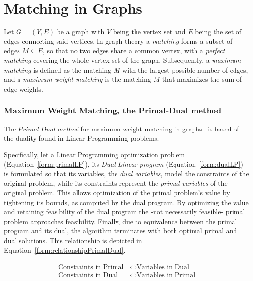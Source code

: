 \section{Matching in Graphs} \label{sec:theorBack-MWMGraphs}

Let $G=(V,E)$ be a graph with $V$ being the vertex set and $E$ being the set of edges connecting said vertices. In graph theory a \emph{matching} forms a subset of edges $M\subseteq E$, so that no two edges share a common vertex, with a \emph{perfect matching} covering the whole vertex set of the graph. Subsequently, a \emph{maximum matching} is defined as the matching $M$ with the largest possible number of edges, and a \emph{maximum weight matching} is the matching $M$ that maximizes the sum of edge weights. 



\subsubsection{Maximum Weight Matching, the Primal-Dual method}

The \emph{Primal-Dual method} for maximum weight matching in graphs~\cite{EdmondsMatching} is based of the duality found in Linear Programming problems.

Specifically, let a Linear Programming optimization problem (Equation~\ref{form:primalLP}), its \emph{Dual Linear program} (Equation~\ref{form:dualLP}) is formulated so that its variables, the \emph{dual variables}, model the constraints of the original problem, while its constraints represent the \emph{primal variables} of the original problem. This allows optimization of the primal problem's value by tightening its bounds, as computed by the dual program. By optimizing the value and retaining feasibility of the dual program the -not necessarily feasible- primal problem approaches feasibility. Finally, due to equivalence between the primal program and its dual, the algorithm terminates with both optimal primal and dual solutions. This relationship is depicted in Equation~\ref{form:relationshipPrimalDual}.

\begin{align}
\begin{split}
\text{Constraints in Primal}&\Longleftrightarrow \text{Variables in Dual}\\
\text{Constraints in Dual}\quad &\Longleftrightarrow \text{Variables in Primal}\label{form:relationshipPrimalDual}
\end{split}
\end{align}

